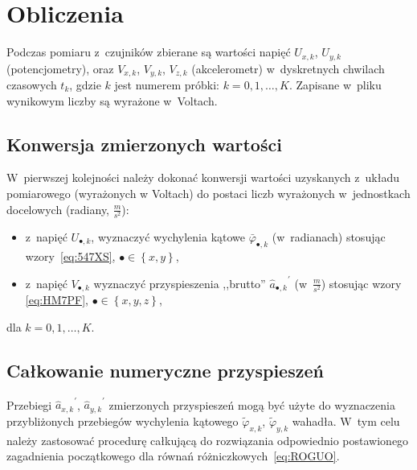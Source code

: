 \documentclass[paper=a4,DIV=12]{lpas}
\begin{document}
\section{Obliczenia}
\label{sec:ZCIBX}

Podczas pomiaru z~czujników zbierane są wartości napięć $U_{x,k}$, $U_{y,k}$
(potencjometry), oraz $V_{x,k}$, $V_{y,k}$, $V_{z,k}$ (akcelerometr)
w~dyskretnych chwilach czasowych $t_k$, gdzie $k$ jest numerem próbki: $k = 0,
1, \dots, K$. Zapisane w~pliku wynikowym liczby są wyrażone w~Voltach.

\subsection{Konwersja zmierzonych wartości}
\label{sec:O9JWA}

W~pierwszej kolejności należy dokonać konwersji wartości uzyskanych z~układu
pomiarowego (wyrażonych w Voltach) do postaci liczb wyrażonych w~jednostkach
docelowych (radiany, $\tfrac{m}{s^2}$):
\begin{itemize}
  \item z~napięć $U_{\bullet,k}$, wyznaczyć
        wychylenia kątowe $\bar{\varphi}_{\bullet,k}$ (w~radianach) stosując
        wzory~\eqref{eq:547XS}, $\bullet \in \left\{x,y\right\}$,
  \item z~napięć $V_{\bullet,k}$ wyznaczyć przyspieszenia
        ,,brutto'' ${\hat{a}_{\bullet,k}}^{\prime}$ (w~$\tfrac{m}{s^2}$)
        stosując wzory \eqref{eq:HM7PF}, $\bullet \in \left\{x,y,z\right\}$,
\end{itemize}
dla $k=0,1,\dots,K$.

\subsection{Całkowanie numeryczne przyspieszeń}
\label{sec:OKCY5}

Przebiegi ${\hat{a}_{x,k}}^{\prime}$, ${\hat{a}_{y,k}}^{\prime}$ zmierzonych
przyspieszeń mogą być użyte do wyznaczenia przybliżonych przebiegów wychylenia
kątowego $\widetilde{\varphi}_{x,k}$, $\widetilde{\varphi}_{y,k}$ wahadła.
W~tym celu należy zastosować procedurę całkującą do rozwiązania odpowiednio
postawionego zagadnienia początkowego dla równań różniczkowych~\eqref{eq:ROGUO}.
\end{document}
